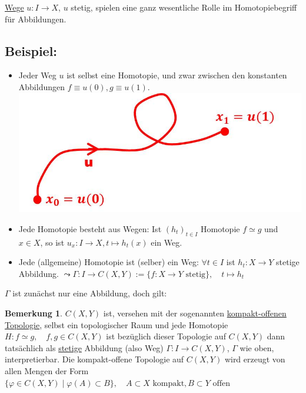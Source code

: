 \documentclass[a4paper,11pt,notitlepage]{report}
\theoremstyle{definition}
\newtheorem{remark}{Bemerkung}[chapter]
\newenvironment{bsp}[1]
{
\setlength{\fboxsep}{10pt}
\subsection*{Beispiel: #1}
\begin{upshape}
}
{
\end{upshape}
}
\begin{document}
\underline{Wege} $u \colon I \rightarrow X$, $u$ stetig, spielen eine ganz wesentliche Rolle im Homotopiebegriff für Abbildungen.

\begin{bsp}{}
	\begin{itemize}
		\item Jeder Weg $u$ ist selbst eine Homotopie, und zwar zwischen den konstanten Abbildungen $f \equiv u(0), g \equiv u(1)$.
			\newline \includegraphics[scale=0.4]{images/Weg_als_Homotopie.jpg}
		\item Jede Homotopie besteht aus Wegen:
			\newline Ist $(h_t)_{t \in I}$ Homotopie $f \simeq g$ und $x \in X$, so ist 
			$u_x \colon I \rightarrow X, t \mapsto h_t(x)$ ein Weg.
		\item Jede (allgemeine) Homotopie ist (selber) ein Weg: \newline
		$\forall t \in I$ ist $h_t \colon X \rightarrow Y$ stetige Abbildung.
		\newline
		$\leadsto \Gamma \colon I \rightarrow C(X,Y) := \{f \colon X \rightarrow Y \text{ stetig}\}, \quad t \mapsto h_t$
	\end{itemize}
	$\Gamma$ ist zunächst nur eine Abbildung, doch gilt:
	\begin{remark}{}
	$C(X,Y)$ ist, versehen mit der sogenannten \underline{kompakt-offenen} \underline{Topologie}, selbst ein topologischer Raum und jede Homotopie $H \colon f \simeq g, \quad f,g \in C(X,Y)$ ist bezüglich dieser Topologie auf $C(X,Y)$ dann tatsächlich als \underline{stetige} Abbildung (also Weg) $\Gamma \colon I \rightarrow C(X,Y)$, $\Gamma$ wie oben, interpretierbar.
\newline
Die kompakt-offene Topologie auf $C(X,Y)$ wird erzeugt von allen Mengen der Form $\{\varphi \in C(X,Y) \mid \varphi(A) \subset B\}, \quad A \subset X \text{ kompakt}, B \subset Y \text{ offen}$
\end{remark}

\end{bsp}
\end{document}
